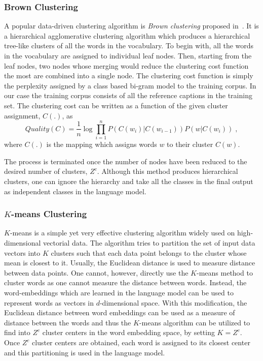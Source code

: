 \subsubsection*{Brown Clustering}
A popular data-driven clustering algorithm is \emph{Brown clustering} proposed
in~\cite{BrownClust}.
It is a hierarchical agglomerative clustering algorithm which produces a hierarchical
tree-like clusters of all the words in the vocabulary.
To begin with, all the words in the vocabulary are assigned to individual leaf
nodes. 
Then, starting from the leaf nodes, two nodes whose merging would reduce the
clustering cost function the most are combined into a single node.
The clustering cost function is simply the perplexity assigned by a class based
bi-gram model to the training corpus. 
In our case the training corpus consists of all the reference captions in the
training set.
The clustering cost can be written as a function of the given cluster
assignment, $C(.)$, as 
\begin{equation}
  \label{eq:brown} 
        Quality(C) = \frac{1}{n} \log \prod_{i=1}^{n} P(C(w_i)|C(w_{i-1})) P(w|C(w_i)) \; ,
\end{equation}
\noindent where $C(.)$ is the mapping which assigns words $w$ to their cluster
$C(w)$.

The process is terminated once the number of nodes have been reduced to the
desired number of clusters, $Z^c$.
Although this method produces hierarchical clusters, one can ignore the
hierarchy and take all the classes in the final output as independent classes in
the language model. 
\subsubsection*{$K$-means Clustering}

$K$-means is a simple yet very effective clustering algorithm widely used on
high-dimensional vectorial data.
The algorithm tries to partition the set of input data vectors into $K$ clusters
such that each data point belongs to the cluster whose mean is closest to
it.
Usually, the Euclidean distance is used to measure distance between data points.
One cannot, however, directly use the $K$-means method to cluster words as one
cannot measure the distance between words.
Instead, the word-embeddings which are learned in the language model can be used
to represent words as vectors in $d$-dimensional space.
With this modification, the Euclidean distance between word embeddings can be
used as a measure of distance between the words and thus the $K$-means algorithm
can be utilized to find into $Z^c$ cluster centers in the word embedding space,
by setting $K=Z^c$.
Once $Z^c$ cluster centers are obtained, each word is assigned to its closest
center and this partitioning is used in the language model.

